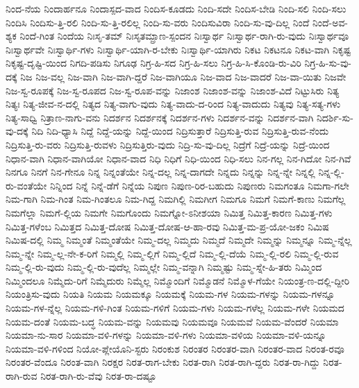 {ನಿಂದ-ನೆಯ
ನಿಂದಾರ್ಹನೂ
ನಿಂದಾಸ್ಪದ-ವಾದ
ನಿಂದಿಸ-ಕೂಡದು
ನಿಂದಿ-ಸದೇ
ನಿಂದಿಸ-ಬೇಡಿ
ನಿಂದಿ-ಸಲಿ
ನಿಂದಿ-ಸಲು
ನಿಂದಿಸಿ
ನಿಂದಿಸು-ತ್ತಿ-ರಲಿ
ನಿಂದಿ-ಸು-ತ್ತಿ-ರಲಿಲ್ಲ
ನಿಂದಿ-ಸು-ವರು
ನಿಂದಿಸುವಿರಾ
ನಿಂದಿ-ಸು-ವು-ದಿಲ್ಲ
ನಿಂದೆ
ನಿಂದೆ-ಅವ-ಶ್ಯಕ
ನಿಂದೆ-ಗಿಂತ
ನಿಂದೆಯ
ನಿಃಸೃ-ತಮ್
ನಿಃಸೃತಮ್ಪ್ರಾಣ-ಸ್ಪಂದನ
ನಿಃಸ್ವಾರ್ಥ
ನಿಃಸ್ವಾರ್ಥ-ರಾಗಿ-ರು-ವುದು
ನಿಃಸ್ವಾರ್ಥವೂ
ನಿಃಸ್ವಾರ್ಥವೇ
ನಿಃಸ್ವಾರ್ಥಿ-ಗಳು
ನಿಃಸ್ವಾರ್ಥಿ-ಯಾಗಿ-ರ-ಬೇಕು
ನಿಃಸ್ವಾರ್ಥಿ-ಯಾಗಿರು
ನಿಕಟ
ನಿಕಟನೂ
ನಿಕಟ-ವಾಗಿ
ನಿಕೃಷ್ಟ
ನಿಕೃಷ್ಟ-ದೃಷ್ಟಿ-ಯಿಂದ
ನಿಗದಿ-ಪಡಿಸು
ನಿಗೂಢ
ನಿಗ್ರ-ಹಿ-ಸದ
ನಿಗ್ರ-ಹಿ-ಸಲು
ನಿಗ್ರ-ಹಿ-ಸಿ-ಕೊಂಡಿ-ರು-ವಿರಿ
ನಿಗ್ರ-ಹಿ-ಸು-ವು-ದಕ್ಕೆ
ನಿಜ
ನಿಜ-ವಲ್ಲ
ನಿಜ-ವಾಗಿ
ನಿಜ-ವಾಗಿ-ದ್ದರೆ
ನಿಜ-ವಾಗಿಯೂ
ನಿಜ-ವಾದ
ನಿಜ-ವಾದರೆ
ನಿಜ-ವಾ-ಯಿತು
ನಿಜವೇ
ನಿಜ-ಸ್ವ-ರೂಪಕ್ಕೆ
ನಿಜ-ಸ್ವ-ರೂಪದ
ನಿಜ-ಸ್ವ-ರೂಪ-ವನ್ನು
ನಿಜಾಂಶ
ನಿಜಾಂಶ-ವನ್ನು
ನಿಜಾಂಶ-ವಿದೆ
ನಿಟ್ಟುಸಿರು
ನಿತ್ಯ
ನಿತ್ಯಃ
ನಿತ್ಯ-ಜೀವ-ನ-ದಲ್ಲಿ
ನಿತ್ಯದ
ನಿತ್ಯ-ವಾಗು-ವುದು
ನಿತ್ಯ-ವಾದು-ದ-ರಿಂದ
ನಿತ್ಯ-ವಾದುದು
ನಿತ್ಯವು
ನಿತ್ಯ-ಸತ್ಯ-ಗಳು
ನಿತ್ಯ-ಸಾಧ್ವಿ
ನಿತ್ರಾಣ-ನಾಗು-ವನು
ನಿದರ್ಶನ
ನಿದರ್ಶನಕ್ಕೆ
ನಿದರ್ಶನ-ಗಳು
ನಿದರ್ಶನ-ವನ್ನು
ನಿದರ್ಶನ-ವಾಗಿ
ನಿದರ್ಶಿ-ಸು-ವು-ದಕ್ಕೆ
ನಿದಿ
ನಿದಿ-ಧ್ಯಾಸಿ
ನಿದ್ದೆ
ನಿದ್ದೆ-ಯನ್ನು
ನಿದ್ದೆ-ಯಿಂದ
ನಿದ್ರಿಸುತ್ತಾರೆ
ನಿದ್ರಿಸುತ್ತಿ-ರುವ
ನಿದ್ರಿಸುತ್ತಿ-ರುವ-ನೆಂದು
ನಿದ್ರಿಸುತ್ತಿ-ರು-ವರು
ನಿದ್ರಿಸುತ್ತಿ-ರುವಳು
ನಿದ್ರಿಸುತ್ತಿರು-ವುದು
ನಿದ್ರಿ-ಸು-ವು-ದಿಲ್ಲ
ನಿದ್ರೆಗೆ
ನಿದ್ರೆ-ಯನ್ನು
ನಿದ್ರೆ-ಯಿಂದ
ನಿಧಾನ-ವಾಗಿ
ನಿಧಾನ-ವಾಗಿಯೋ
ನಿಧಾನ-ವಾದ
ನಿಧಿ
ನಿಧಿಗೆ
ನಿಧಿ-ಯಿಂದ
ನಿಧಿ-ಸಲು
ನಿನ-ಗಲ್ಲ
ನಿನ-ಗಿದೋ
ನಿನ-ಗಿವೆ
ನಿನಗೂ
ನಿನಗೆ
ನಿನ-ಗೇನೂ
ನಿನ್ನ
ನಿನ್ನಂತೆಯೇ
ನಿನ್ನ-ದಲ್ಲ
ನಿನ್ನ-ದಾಗದೇ
ನಿನ್ನದು
ನಿನ್ನನ್ನು
ನಿನ್ನ-ನ್ನೇ
ನಿನ್ನಲ್ಲಿ
ನಿನ್ನ-ಲ್ಲಿ-ರು-ವಂತೆಯೇ
ನಿನ್ನಿಂದ
ನಿನ್ನೆ
ನಿನ್ನೆ-ಡೆಗೆ
ನಿನ್ನೆಯ
ನಿಪುಣ
ನಿಪುಣ-ರಿರ-ಬಹುದು
ನಿಪುಣರು
ನಿಮಗಂತೂ
ನಿಮಗಾ-ಗಲೇ
ನಿಮ-ಗಾಗಿ
ನಿಮ-ಗಿಂತ
ನಿಮ-ಗಿಂತಲೂ
ನಿಮ-ಗಿದ್ದ
ನಿಮಗಿಲ್ಲಿ
ನಿಮಗೀಗ
ನಿಮಗೂ
ನಿಮಗೆ
ನಿಮಗೆ-ಕಾಣು
ನಿಮಗೆಲ್ಲ
ನಿಮಗೆಲ್ಲಾ
ನಿಮಗೆ-ಲ್ಲಿಯ
ನಿಮಗೇ
ನಿಮಗೊಂದು
ನಿಮಗ್ನೋ-ಽನೀಶಯಾ
ನಿಮಿತ್ತ
ನಿಮಿತ್ತ-ಕಾರಣ
ನಿಮಿತ್ತ-ಗಳು
ನಿಮಿತ್ತ-ಗಳೆಂಬ
ನಿಮಿತ್ತದ
ನಿಮಿತ್ತ-ದೋಷ
ನಿಮಿತ್ತ-ದೋಷ-ಆ-ಹಾ-ರವು
ನಿಮಿತ್ತ-ಮ-ಪ್ರ-ಯೋ-ಜಕಂ
ನಿಮಿಷ
ನಿಮಿಷ-ದಲ್ಲಿ
ನಿಮ್ಮ
ನಿಮ್ಮಂತೆ
ನಿಮ್ಮಂತೆಯೇ
ನಿಮ್ಮ-ದಲ್ಲ
ನಿಮ್ಮದು
ನಿಮ್ಮದೆ
ನಿಮ್ಮದೇ
ನಿಮ್ಮನ್ನು
ನಿಮ್ಮನ್ನೂ
ನಿಮ್ಮ-ನ್ನೆಲ್ಲ
ನಿಮ್ಮ-ನ್ನೇ
ನಿಮ್ಮ-ಲ್ಲ-ನೇ-ಕ-ರಿಗೆ
ನಿಮ್ಮಲ್ಲಿ
ನಿಮ್ಮ-ಲ್ಲಿಗೆ
ನಿಮ್ಮ-ಲ್ಲಿದೆ
ನಿಮ್ಮ-ಲ್ಲಿ-ದೆಯೆ
ನಿಮ್ಮ-ಲ್ಲಿ-ರಲಿ
ನಿಮ್ಮ-ಲ್ಲಿ-ರುವ
ನಿಮ್ಮ-ಲ್ಲಿ-ರು-ವುದು
ನಿಮ್ಮ-ಲ್ಲಿ-ರು-ವುದೆಲ್ಲ
ನಿಮ್ಮಲ್ಲೇ
ನಿಮ್ಮ-ವನ್ನಾಗಿ
ನಿಮ್ಮಷ್ಟು
ನಿಮ್ಮ-ಸ್ನೇ-ಹಿ-ತರು
ನಿಮ್ಮಿಂದ
ನಿಮ್ಮಿಂದಲೂ
ನಿಮ್ಮೆದು-ರಿಗೆ
ನಿಮ್ಮೆದುರು
ನಿಮ್ಮೆಲ್ಲ
ನಿಮ್ಮೊಂದಿಗೆ
ನಿಮ್ಮೊಡನೆ
ನಿಮ್ಮೊಳ-ಗೆಯೇ
ನಿಯಂತ್ರ-ಣ-ದಲ್ಲಿ-ದ್ದೀರಿ
ನಿಯಂತ್ರಿಸು-ವುದು
ನಿಯತಿ
ನಿಯಮ
ನಿಯಮಕ್ಕೂ
ನಿಯಮಕ್ಕೆ
ನಿಯಮ-ಗಳ
ನಿಯಮ-ಗಳನ್ನು
ನಿಯಮ-ಗಳನ್ನೂ
ನಿಯಮ-ಗಳ-ನ್ನೆಲ್ಲ
ನಿಯಮ-ಗಳಿ-ಗಿಂತ
ನಿಯಮ-ಗಳಿಗೆ
ನಿಯಮ-ಗಳು
ನಿಯಮ-ಗಳೆಲ್ಲ
ನಿಯಮ-ಗಳೇ
ನಿಯಮದ
ನಿಯಮ-ದಂತೆ
ನಿಯಮ-ಬದ್ಧ
ನಿಯಮ-ವನ್ನು
ನಿಯಮವು
ನಿಯಮವೂ
ನಿಯಮವೆ
ನಿಯಮ-ವೆಂದರೆ
ನಿಯಮಾ
ನಿಯಮಾ-ನು-ಸಾರ
ನಿಯಮಾ-ವಳಿ-ಗಳನ್ನು
ನಿಯಮಾ-ವಳಿ-ಗಳು
ನಿಯಮಾ-ವಳಿಯ
ನಿಯಮಾ-ವಳಿ-ಯನ್ನೂ
ನಿಯಮಾ-ವಳಿ-ಗಳಿಂದ
ನಿಯೋ-ಪ್ಲೇಯೊನಿ-ಸ್ಟರು
ನಿರಂಕುಶ
ನಿರಂತರ
ನಿರಂತರ-ವಾಗಿ
ನಿರಂತರ-ವಾದ
ನಿರಂತ-ರವೂ
ನಿರಂತರ-ವೆಂದೂ
ನಿರಂತ-ವಾಗಿ
ನಿರಕ್ಷರ
ನಿರತ-ರಾಗ-ಬೇಕು
ನಿರತ-ರಾಗಿ
ನಿರತ-ರಾಗಿ-ದ್ದರು
ನಿರತ-ರಾ-ಗಿದ್ದು
ನಿರತ-ರಾಗಿ-ರುವ
ನಿರತ-ರಾಗಿ-ರು-ವೆವು
ನಿರತ-ರಾ-ದಷ್ಟೂ
}
